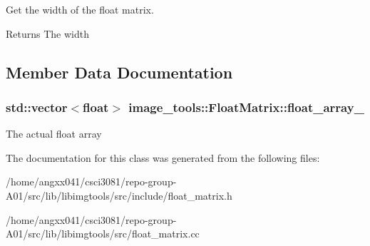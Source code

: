 Get the width of the float matrix. 

\begin{DoxyReturn}{Returns}
The width 
\end{DoxyReturn}


\subsection{Member Data Documentation}
\subsubsection[{\texorpdfstring{float\+\_\+array\+\_\+}{float_array_}}]{\setlength{\rightskip}{0pt plus 5cm}std\+::vector$<$float$>$ image\+\_\+tools\+::\+Float\+Matrix\+::float\+\_\+array\+\_\+\hspace{0.3cm}{\ttfamily [private]}}\hypertarget{classimage__tools_1_1FloatMatrix_a9e1cb78887534862b81fbf10a64ebfbf}{}\label{classimage__tools_1_1FloatMatrix_a9e1cb78887534862b81fbf10a64ebfbf}
The actual float array 

The documentation for this class was generated from the following files\+:\begin{DoxyCompactItemize}
\item 
/home/angxx041/csci3081/repo-\/group-\/\+A01/src/lib/libimgtools/src/include/float\+\_\+matrix.\+h\item 
/home/angxx041/csci3081/repo-\/group-\/\+A01/src/lib/libimgtools/src/float\+\_\+matrix.\+cc\end{DoxyCompactItemize}

